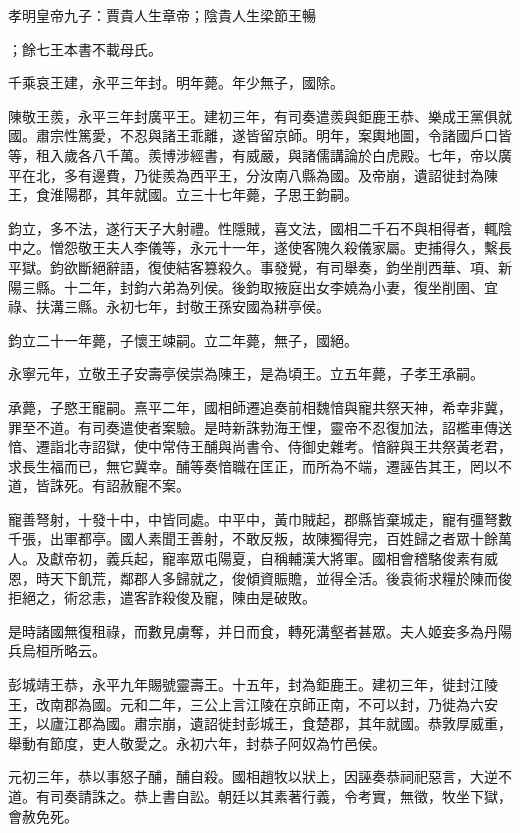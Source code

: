 
\begin{pinyinscope}
孝明皇帝九子：賈貴人生章帝；陰貴人生梁節王暢

；餘七王本書不載母氏。

千乘哀王建，永平三年封。明年薨。年少無子，國除。

陳敬王羨，永平三年封廣平王。建初三年，有司奏遣羨與鉅鹿王恭、樂成王黨俱就國。肅宗性篤愛，不忍與諸王乖離，遂皆留京師。明年，案輿地圖，令諸國戶口皆等，租入歲各八千萬。羨博涉經書，有威嚴，與諸儒講論於白虎殿。七年，帝以廣平在北，多有邊費，乃徙羨為西平王，分汝南八縣為國。及帝崩，遺詔徙封為陳王，食淮陽郡，其年就國。立三十七年薨，子思王鈞嗣。

鈞立，多不法，遂行天子大射禮。性隱賊，喜文法，國相二千石不與相得者，輒陰中之。憎怨敬王夫人李儀等，永元十一年，遂使客隗久殺儀家屬。吏捕得久，繫長平獄。鈞欲斷絕辭語，復使結客篡殺久。事發覺，有司舉奏，鈞坐削西華、項、新陽三縣。十二年，封鈞六弟為列侯。後鈞取掖庭出女李嬈為小妻，復坐削圉、宜祿、扶溝三縣。永初七年，封敬王孫安國為耕亭侯。

鈞立二十一年薨，子懷王竦嗣。立二年薨，無子，國絕。

永寧元年，立敬王子安壽亭侯崇為陳王，是為頃王。立五年薨，子孝王承嗣。

承薨，子愍王寵嗣。熹平二年，國相師遷追奏前相魏愔與寵共祭天神，希幸非冀，罪至不道。有司奏遣使者案驗。是時新誅勃海王悝，靈帝不忍復加法，詔檻車傳送愔、遷詣北寺詔獄，使中常侍王酺與尚書令、侍御史雜考。愔辭與王共祭黃老君，求長生福而已，無它冀幸。酺等奏愔職在匡正，而所為不端，遷誣告其王，罔以不道，皆誅死。有詔赦寵不案。

寵善弩射，十發十中，中皆同處。中平中，黃巾賊起，郡縣皆棄城走，寵有彊弩數千張，出軍都亭。國人素聞王善射，不敢反叛，故陳獨得完，百姓歸之者眾十餘萬人。及獻帝初，義兵起，寵率眾屯陽夏，自稱輔漢大將軍。國相會稽駱俊素有威恩，時天下飢荒，鄰郡人多歸就之，俊傾資賑贍，並得全活。後袁術求糧於陳而俊拒絕之，術忿恚，遣客詐殺俊及寵，陳由是破敗。

是時諸國無復租祿，而數見虜奪，并日而食，轉死溝壑者甚眾。夫人姬妾多為丹陽兵烏桓所略云。

彭城靖王恭，永平九年賜號靈壽王。十五年，封為鉅鹿王。建初三年，徙封江陵王，改南郡為國。元和二年，三公上言江陵在京師正南，不可以封，乃徙為六安王，以廬江郡為國。肅宗崩，遺詔徙封彭城王，食楚郡，其年就國。恭敦厚威重，舉動有節度，吏人敬愛之。永初六年，封恭子阿奴為竹邑侯。

元初三年，恭以事怒子酺，酺自殺。國相趙牧以狀上，因誣奏恭祠祀惡言，大逆不道。有司奏請誅之。恭上書自訟。朝廷以其素著行義，令考實，無徵，牧坐下獄，會赦免死。


\end{pinyinscope}
